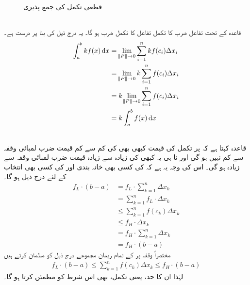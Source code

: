 \begin{figure}
\centering
{}
\caption{قطعی تکمل کی جمع پذیری}
\label{شکل_تکمل_جمع_پذیری}
\end{figure}
 \\
قاعدہ  کے تحت تفاعل ضرب  کا تکمل تفاعل کا تکمل ضرب  ہو گا۔ یہ درج ذیل کی بنا پر درست ہے۔
\begin{align*}
\int_a^bkf(x)\dif x&=\lim_{\norm{P}\to0}\sum\limits_{i=1}^n kf(c_i)\Delta x_i\\
&=\lim_{\norm{P}\to 0}k\sum\limits_{i=1}^nf(c_i)\Delta x_i\\
&=k\lim_{\norm{P}\to 0}\sum\limits_{i=1}^n f(c_i)\Delta x_i\\
&=k\int_a^bf(x)\dif x
\end{align*}

\\
قاعدہ  کہتا ہے کہ  پر تکمل کی قیمت کبھی بھی  کی کم سے کم قیمت ضرب لمبائی وقفہ سے کم نہیں ہو گی اور نا ہی یہ کبھی  کی زیادہ سے زیادہ قیمت ضرب لمبائی وقفہ سے زیادہ ہو گی۔ اس کی وجہ یہ ہے کہ  کی کسی بھی خانہ بندی اور  کی کسی بھی انتخاب کے لئے درج ذیل ہو گا۔
\begin{align*}
f_L\cdot(b-a)&=f_L\cdot\sum\limits_{k=1}^n \Delta x_k\\
&=\sum\limits_{k=1}^n f_L\cdot \Delta x_k\\
&\le \sum\limits_{k=1}^n f(c_k)\Delta x_k\\
&\le f_H\cdot \Delta x_k\\
&=f_H\cdot \sum\limits_{k=1}^n \Delta x_k\\
&=f_H\cdot (b-a)
\end{align*}
مختصراً وقفہ  پر  کے تمام ریمان مجموعے درج ذیل کو مطمئن کرتے ہیں
\begin{align*}
f_L\cdot (b-a)\le \sum\limits_{k=1}^n f(c_k)\Delta x_k\le f_H\cdot(b-a)
\end{align*}
لہٰذا ان کا حد، یعنی تکمل، بھی اس شرط کو مطمئن کرتا ہو گا۔


